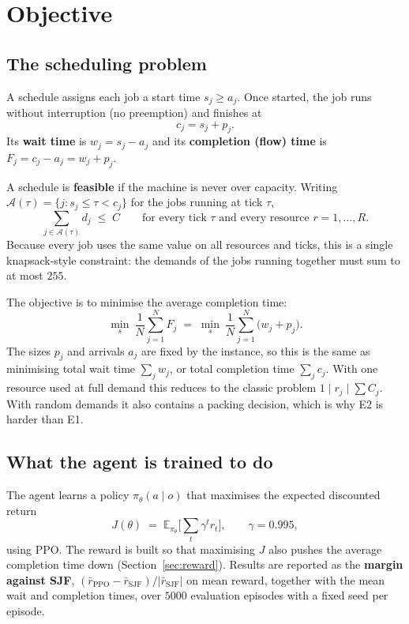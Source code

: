 \documentclass[11pt]{article}
\newcommand{\N}{N}              %
\newcommand{\R}{R}              %
\newcommand{\Cap}{C}            %
\begin{document}
\section{Objective}

\subsection*{The scheduling problem}

A schedule assigns each job a start time $s_j \ge a_j$. Once started, the job runs without interruption (no preemption) and finishes at
\[
  c_j = s_j + p_j .
\]
Its \textbf{wait time} is $w_j = s_j - a_j$ and its \textbf{completion (flow) time} is $F_j = c_j - a_j = w_j + p_j$.

A schedule is \textbf{feasible} if the machine is never over capacity. Writing $\mathcal{A}(\tau) = \{ j : s_j \le \tau < c_j \}$ for the jobs running at tick $\tau$,
\[
  \sum_{j \in \mathcal{A}(\tau)} d_j \;\le\; \Cap
  \qquad \text{for every tick } \tau \text{ and every resource } r = 1,\dots,\R .
\]
Because every job uses the same value on all resources and ticks, this is a single knapsack-style constraint: the demands of the jobs running together must sum to at most $255$.

The objective is to minimise the average completion time:
\[
  \min_{s}\ \frac{1}{\N}\sum_{j=1}^{\N} F_j
  \;=\; \min_{s}\ \frac{1}{\N}\sum_{j=1}^{\N} \big(w_j + p_j\big).
\]
The sizes $p_j$ and arrivals $a_j$ are fixed by the instance, so this is the same as minimising total wait time $\sum_j w_j$, or total completion time $\sum_j c_j$. With one resource used at full demand this reduces to the classic problem $1 \mid r_j \mid \sum C_j$. With random demands it also contains a packing decision, which is why E2 is harder than E1.

\subsection*{What the agent is trained to do}

The agent learns a policy $\pi_\theta(a \mid o)$ that maximises the expected discounted return
\[
  J(\theta) \;=\; \mathbb{E}_{\pi_\theta}\!\Big[\sum_{t} \gamma^{t} r_t\Big],
  \qquad \gamma = 0.995 ,
\]
using PPO. The reward is built so that maximising $J$ also pushes the average completion time down (Section~\ref{sec:reward}). Results are reported as the \textbf{margin against SJF}, $(\bar r_{\text{PPO}} - \bar r_{\text{SJF}})/|\bar r_{\text{SJF}}|$ on mean reward, together with the mean wait and completion times, over $5000$ evaluation episodes with a fixed seed per episode.
\end{document}
